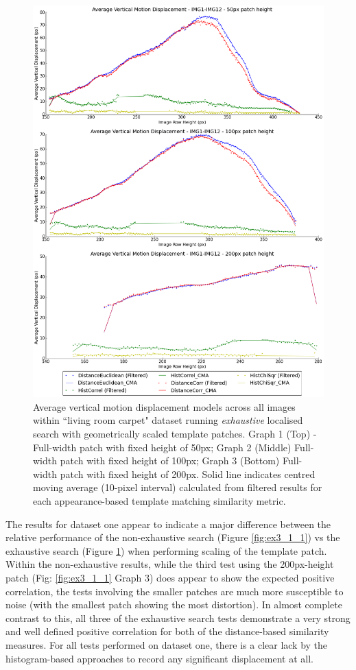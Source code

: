 \clearpage
\begin{figure}[ht!]
\centering
\includegraphics[scale=0.3]{images/results/flat_10cm_scaled_exhaustive}
\caption{Average vertical motion displacement models across all images within ``living room carpet" dataset running \textit{exhaustive} localised search with geometrically scaled template patches. Graph 1 (Top) - Full-width patch with fixed height of 50px; Graph 2 (Middle) Full-width patch with fixed height of 100px; Graph 3 (Bottom) Full-width patch with fixed height of 200px. Solid line indicates centred moving average (10-pixel interval) calculated from filtered results for each appearance-based template matching similarity metric.}
\label{fig:ex3_1_2}
\end{figure}

The results for dataset one appear to indicate a major difference between the relative performance of the non-exhaustive search (Figure \ref{fig:ex3_1_1}) vs the exhaustive search (Figure \ref{fig:ex3_1_2}) when performing scaling of the template patch. Within the non-exhaustive results, while the third test using the 200px-height patch (Fig: \ref{fig:ex3_1_1} Graph 3) does appear to show the expected positive correlation, the tests involving the smaller patches are much more susceptible to noise (with the smallest patch showing the most distortion). In almost complete contrast to this, all three of the exhaustive search tests demonstrate a very strong and well defined positive correlation for both of the distance-based similarity measures. For all tests performed on dataset one, there is a clear lack by the histogram-based approaches to record any significant displacement at all.

